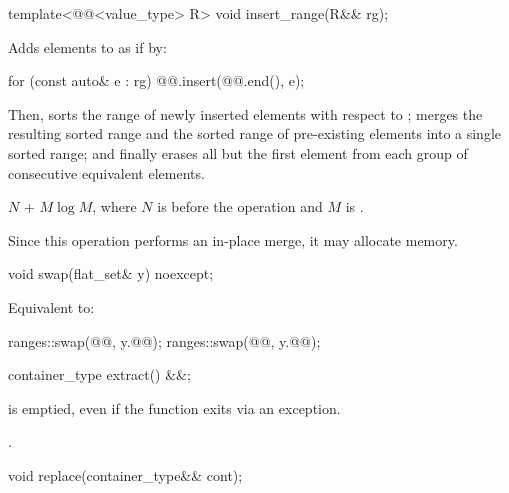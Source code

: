 %
\begin{itemdecl}
template<@@<value_type> R>
  void insert_range(R&& rg);
\end{itemdecl}

\begin{itemdescr}
\pnum
\effects
Adds elements to  as if by:
\begin{codeblock}
for (const auto& e : rg) {
  @@.insert(@@.end(), e);
}
\end{codeblock}
Then,
sorts the range of newly inserted elements with respect to ;
merges the resulting sorted range and
the sorted range of pre-existing elements into a single sorted range; and
finally erases all but the first element
from each group of consecutive equivalent elements.

\pnum
\complexity
$N$ + $M \log M$, where $N$ is  before the operation and $M$
is .

\pnum
\remarks
Since this operation performs an in-place merge, it may allocate memory.
\end{itemdescr}

%
\begin{itemdecl}
void swap(flat_set& y) noexcept;
\end{itemdecl}

\begin{itemdescr}
\pnum
\effects
Equivalent to:
\begin{codeblock}
ranges::swap(@@, y.@@);
ranges::swap(@@, y.@@);
\end{codeblock}
\end{itemdescr}

%
\begin{itemdecl}
container_type extract() &&;
\end{itemdecl}

\begin{itemdescr}
\pnum
\ensures
{} is emptied, even if the function exits via an exception.

\pnum
\returns
{}.
\end{itemdescr}

%
\begin{itemdecl}
void replace(container_type&& cont);
\end{itemdecl}

